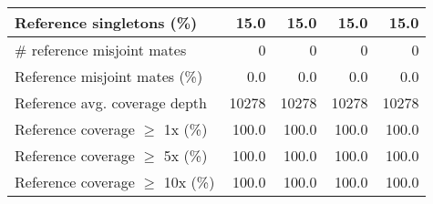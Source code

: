 \documentclass[12pt,a4paper]{article}
\begin{document}
\begin{table}[ht]
\begin{center}
\begin{tabular}{|l*{4}{|r}|}
Reference singletons (\%) & 15.0 & 15.0 & 15.0 & 15.0 \\ \hline
\# reference misjoint mates & 0 & 0 & 0 & 0 \\ \hline
Reference misjoint mates (\%) & 0.0 & 0.0 & 0.0 & 0.0 \\ \hline
Reference avg. coverage depth & 10278 & 10278 & 10278 & 10278 \\ \hline
Reference coverage $\geq$ 1x (\%) & 100.0 & 100.0 & 100.0 & 100.0 \\ \hline
Reference coverage $\geq$ 5x (\%) & 100.0 & 100.0 & 100.0 & 100.0 \\ \hline
Reference coverage $\geq$ 10x (\%) & 100.0 & 100.0 & 100.0 & 100.0 \\ \hline
\end{tabular}
\end{center}
\end{table}
\end{document}
